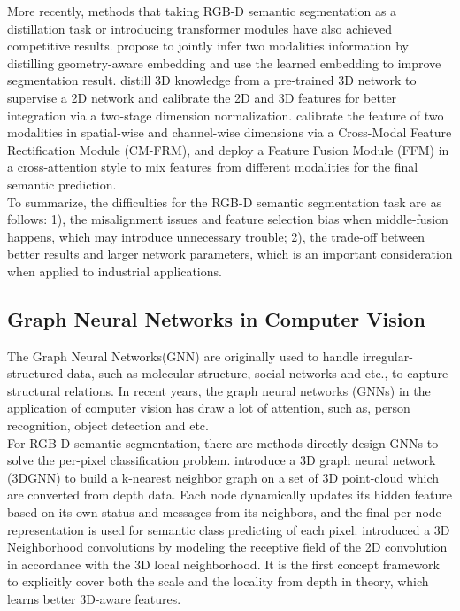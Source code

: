 \documentclass[journal]{IEEEtran}
\begin{document}
    More recently, methods that taking RGB-D semantic segmentation as a distillation task or introducing transformer modules have also achieved competitive results. \cite{jiao2019geometrydistillation} propose to  jointly infer two modalities information by distilling geometry-aware embedding and use the learned embedding to improve segmentation result. \cite{liu2021distillation} distill 3D knowledge from a pre-trained 3D network to supervise a 2D network and calibrate the 2D and 3D features for better integration via a two-stage dimension normalization. \cite{liu2022cmx} calibrate the feature of two modalities in spatial-wise and channel-wise dimensions via a Cross-Modal Feature Rectification Module (CM-FRM), and deploy a Feature Fusion Module (FFM) in a cross-attention style to mix features from different modalities for the final semantic prediction. \\   
  
    To summarize, the difficulties for the RGB-D semantic segmentation task are as follows: 1), the misalignment issues and feature selection bias when middle-fusion happens, which may introduce unnecessary trouble; 2), the trade-off between better results and larger network parameters, which is an important consideration when applied to industrial applications.  \\   

\subsection{Graph Neural Networks in Computer Vision}  
 
    The Graph Neural Networks(GNN) are originally used to handle irregular-structured data, such as molecular structure, social networks and etc., to capture structural relations. In recent years, the graph neural networks (GNNs) in the application of computer vision has draw a lot of attention, such as, person recognition\cite{yao2022sparse}, object detection\cite{zhao2021graphfpn}\cite{shi2020point}\cite{zhang2021pc} and etc.  \\   
 
   
    For RGB-D semantic segmentation, there are methods directly design GNNs to solve the per-pixel classification problem. \cite{qi20173d} introduce a 3D graph neural network (3DGNN) to build a k-nearest neighbor graph on a set of 3D point-cloud which are converted from depth data. Each node dynamically updates its hidden feature based on its own status and messages from its neighbors, and the final per-node representation is used for semantic class predicting of each pixel.  \cite{chen20193dneighbor}introduced a 3D Neighborhood convolutions by modeling the receptive field of the 2D convolution in accordance with the 3D local neighborhood. It is the first concept framework to explicitly cover both the scale and the locality from depth in theory, which learns better 3D-aware features.\\   
    
\end{document}
